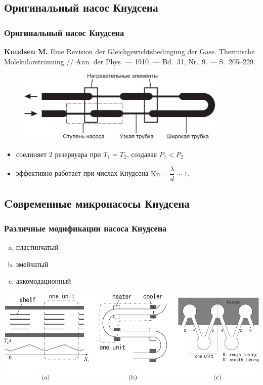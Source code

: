 \documentclass[ucs]{beamer}
\newcommand{\Kn}{\mathrm{Kn}}
\begin{document}
\subsection{Оригинальный насос Кнудсена}
\begin{frame}
	\frametitle{Оригинальный насос Кнудсена}
	\begin{block}{}
		\textbf{Knudsen M.} Eine Revision der Gleichgewichtsbedingung der Gase. Thermische Molekularströmung
		// Ann. der Phys. — 1910. — Bd.~31, Nr.~9. — S.~205–229.
	\end{block}
	\begin{figure}
		\includegraphics[width=10cm]{knudsen_device.pdf}
	\end{figure}
	\begin{itemize}
		\item соединяет 2 резервуара при \(T_1=T_2\), создавая \(P_1<P_2\)
		\item эффективно работает при числах Кнудсена \( \Kn=\dfrac{\lambda}{d} \sim 1\).
	\end{itemize}
\end{frame}

\subsection{Cовременные микронасосы Кнудсена}
\begin{frame}
	\frametitle{Различные модификации насоса Кнудсена}
	\begin{enumerate}[(a)]
		\item пластинчатый
		\item змейчатый
		\item аккомодационный
	\end{enumerate}
	\bigskip
	\includegraphics[width=\columnwidth]{pumps.png}
\end{frame}
\end{document}
